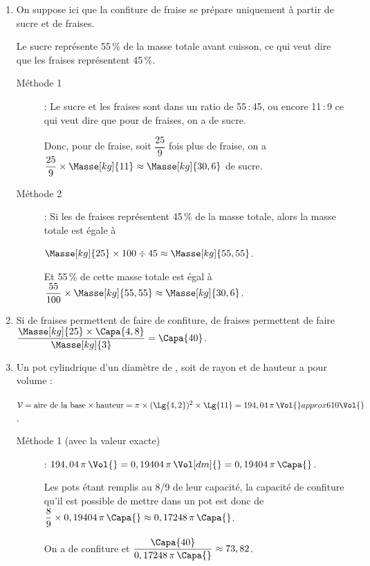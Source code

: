 \begin{enumerate}
   \item On suppose ici que la confiture de fraise se prépare uniquement à partir de sucre et de fraises. \par
      Le sucre représente 55\,\% de la masse totale avant cuisson, ce qui veut dire que les fraises représentent 45\,\%.
      \begin{description}
         \item[Méthode 1] : Le sucre et les fraises sont dans un ratio de 55\,:\,45, ou encore 11\,:\,9 ce qui veut dire que pour  de fraises, on a  de sucre. \par
            Donc, pour  de fraise, soit $\dfrac{25}{9}$ fois plus de fraise, on a $\dfrac{25}{9}\times\Masse[kg]{11} \approx\Masse[kg]{30,6}$ de sucre.
         \item[Méthode 2] : Si les  de fraises représentent 45\,\% de la masse totale, alors la masse totale est égale à \par
            $\Masse[kg]{25}\times100\div45 \approx\Masse[kg]{55,55}$. \par
            Et 55\,\% de cette masse totale est égal à $\dfrac{55}{100}\times\Masse[kg]{55,55} \approx\Masse[kg]{30,6}$.
      \end{description}
   \item Si  de fraises permettent de faire  de confiture,  de fraises permettent de faire $\dfrac{\Masse[kg]{25}\times\Capa{4,8}}{\Masse[kg]{3}} =\Capa{40}$. \par
   \item Un pot cylindrique d'un diamètre de , soit de rayon  et de hauteur  a pour volume  : \par
      $\mathcal{V} =\text{aire de la base}\times\text{hauteur} =\pi\times(\Lg{4,2})^2\times\Lg{11} =194,04\,\pi\,\Vol{} \\approx  610 \Vol{}$. \par
      \begin{description}
         \item[Méthode 1 (avec la valeur exacte)] : $194,04\,\pi\,\Vol{} =0,19404\,\pi\,\Vol[dm]{} =0,19404\,\pi\,\Capa{}$. \par
      Les pots étant remplis au 8/9 de leur capacité, la capacité de confiture qu'il est possible de mettre dans un pot est donc de $\dfrac89\times0,19404\,\pi\,\Capa{} \approx0,17248\,\pi\,\Capa{}$. \par
      On a  de confiture et $\dfrac{\Capa{40}}{0,17248\,\pi\,\Capa{}} \approx73,82$. 
      

\end{description}
\end{enumerate}

